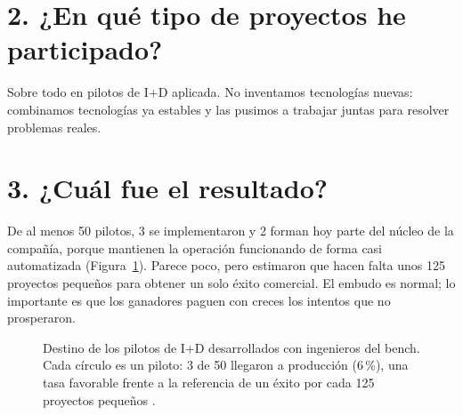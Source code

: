 \documentclass[11pt,letterpaper]{article}
\begin{document}
\section*{2. ¿En qué tipo de proyectos he participado?}

Sobre todo en pilotos de I+D aplicada. No inventamos tecnologías nuevas:
combinamos tecnologías ya estables y las pusimos a trabajar juntas para
resolver problemas reales.

\section*{3. ¿Cuál fue el resultado?}

De al menos 50 pilotos, 3 se implementaron y 2 forman hoy parte del núcleo de
la compañía, porque mantienen la operación funcionando de forma casi
automatizada (Figura~\ref{fig:pilotos}). Parece poco, pero
\textcite{stevens1997} estimaron que hacen falta unos 125 proyectos pequeños
para obtener un solo éxito comercial. El embudo es normal; lo importante es
que los ganadores paguen con creces los intentos que no prosperaron.

\begin{figure}[H]
\centering
{}
\caption{Destino de los pilotos de I+D desarrollados con ingenieros del bench.
Cada círculo es un piloto: 3 de 50 llegaron a producción (6\,\%), una tasa
favorable frente a la referencia de un éxito por cada 125 proyectos pequeños
\parencite{stevens1997}.}
\label{fig:pilotos}
\end{figure}
\end{document}
